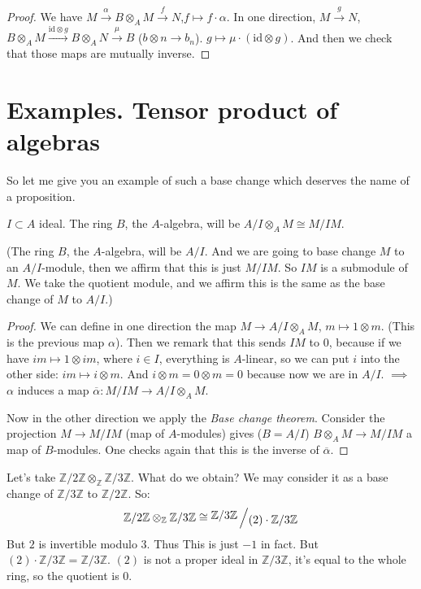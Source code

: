 \begin{proof}
We have $M\xrightarrow{\alpha} B \otimes_A M \xrightarrow{f} N$,$f\mapsto f\cdot\alpha$. In one direction, $M\xrightarrow{g} N$, $B\otimes_A M\xrightarrow{\text{id}\otimes g}B\otimes_A N\xrightarrow{\mu}B$ ($b\otimes n \to b_n$). $g\mapsto \mu\cdot(\text{id}\otimes g)$.  And then we check that those maps are mutually inverse.
\end{proof}

\section{Examples. Tensor product of algebras}

So let me give you an example of such a base change which deserves the name of a proposition. 

\begin{proposition}
$I\subset A$ ideal. The ring $B$, the $A$-algebra, will be $A/I \otimes_A M\cong M/IM$.

(The ring $B$, the $A$-algebra, will be $A/I$. And we are going to base change $M$ to an $A/I$-module, then we affirm that this is just $M/IM$. So $IM$ is a submodule of $M$. We take the quotient module, and we affirm this is the same as the base change of $M$ to $A/I$.)
\end{proposition}

\begin{proof}
We can define in one direction the map $M \to A/I \otimes_A M$, $m\mapsto 1\otimes m$. (This is the previous map $\alpha$). Then we remark that this sends $IM$ to $0$, because if we have $im\mapsto 1\otimes im$, where $i\in I$, everything is $A$-linear, so we can put $i$ into the other side: $im\mapsto i\otimes m$. And $i\otimes m=0\otimes m=0$ because now we are in $A/I$. $\implies$ $\alpha$ induces a map $\overbar{\alpha}: M/IM\to A/I\otimes_A M$.

Now in the other direction we apply the \textit{Base change theorem}. Consider the projection $M \to M/IM$ (map of $A$-modules) gives ($B=A/I$) $B\otimes_A M\to M/IM$ a map of $B$-modules. One checks again that this is the inverse of $\overbar{\alpha}$. 
\end{proof}


\begin{example}
Let's take $\mathbb{Z}/2\mathbb{Z}\otimes_{\mathbb{Z}} \mathbb{Z}/3\mathbb{Z}$. What do we obtain? We may consider it as a base change of $\mathbb{Z}/3\mathbb{Z}$ to $\mathbb{Z}/2\mathbb{Z}$. So:
\[
\mathbb{Z}/2\mathbb{Z}\otimes_{\mathbb{Z}} \mathbb{Z}/3\mathbb{Z}\cong 
\bigslant{\mathbb{Z}/3\mathbb{Z}}{(2)\cdot \mathbb{Z}/3\mathbb{Z} }
\]
But $2$ is invertible modulo $3$. Thus This is just $-1$ in fact. But $(2)\cdot \mathbb{Z}/3\mathbb{Z} = \mathbb{Z}/3\mathbb{Z}$. $(2)$ is not a proper ideal in $\mathbb{Z}/3\mathbb{Z}$, it's equal to the whole ring, so the quotient is $0$.
\end{example}


